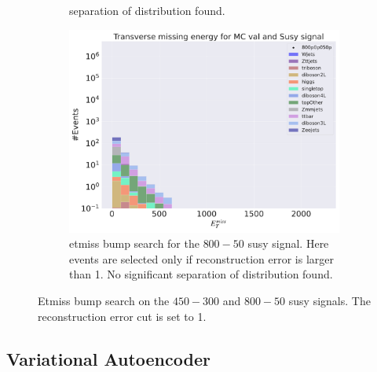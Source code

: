 \begin{figure}[h!]
\begin{subfigure}{.45\textwidth}
{        separation of distribution found.}
        \label{fig:ae_susy_450_300_trilep}
    \end{subfigure}
    \hfill        
    \begin{subfigure}{.45\textwidth}
        \includegraphics[width=\textwidth]{Figures/AE_testing/small/b_data_recon_big_rm3_feats_sig_800p0p050p_etmiss.pdf}
        \caption{etmiss bump search for the $800-50$ susy signal. Here events are selected only if reconstruction error is larger than 1. No significant 
        separation of distribution found.}
        \label{fig:ae_susy_800_50_trilep}
    \end{subfigure} 
    \hfill     
    \caption{Etmiss bump search on the $450-300$ and $800-50$ susy signals. The reconstruction error cut is set to 1.}
    \label{fig:ae_susy_450_300_800_50_recon_trilep}
\end{figure}


\subsection*{Variational Autoencoder}

